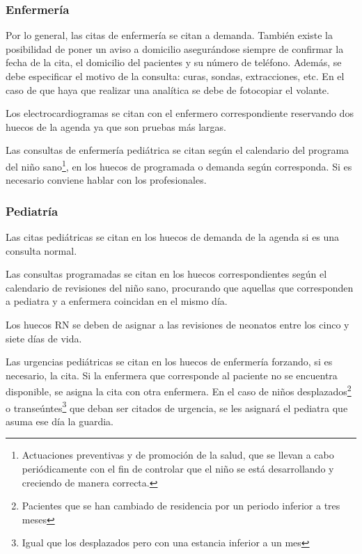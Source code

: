\subsubsection{Enfermería}

Por lo general, las citas de enfermería se citan a demanda.
También existe la posibilidad de poner un aviso a domicilio asegurándose siempre de confirmar la fecha de la cita, el domicilio del pacientes y su número de teléfono.
Además, se debe especificar el motivo de la consulta: curas, sondas, extracciones, etc.
En el caso de que haya que realizar una analítica se debe de fotocopiar el \gls{volante}.

Los \glspl{electrocardiograma} se citan con el enfermero correspondiente reservando dos huecos de la agenda ya que son pruebas más largas.

Las consultas de enfermería pediátrica se citan según el calendario del programa del niño sano\footnote{Actuaciones preventivas y de promoción de la salud, que se llevan a cabo periódicamente con el fin de controlar que el niño se está desarrollando y creciendo de manera correcta.}, en los huecos de programada o demanda según corresponda. Si es necesario conviene hablar con los profesionales.

\subsubsection{Pediatría}

Las citas pediátricas se citan en los huecos de demanda de la agenda si es una consulta normal.

Las consultas programadas se citan en los huecos correspondientes según el calendario de revisiones del niño sano, procurando que aquellas que corresponden a pediatra y a enfermera coincidan en el mismo día.

Los huecos RN se deben de asignar a las revisiones de neonatos entre los cinco y siete días de vida.

Las urgencias pediátricas se citan en los huecos de enfermería forzando, si es necesario, la cita.
Si la enfermera que corresponde al paciente no se encuentra disponible, se asigna la cita con otra enfermera.
En el caso de niños desplazados\footnote{Pacientes que se han cambiado de residencia por un periodo inferior a tres meses} o transeúntes\footnote{Igual que los desplazados pero con una estancia inferior a un mes} que deban ser citados de urgencia, se les asignará el pediatra que asuma ese día la \gls{guardia}.

